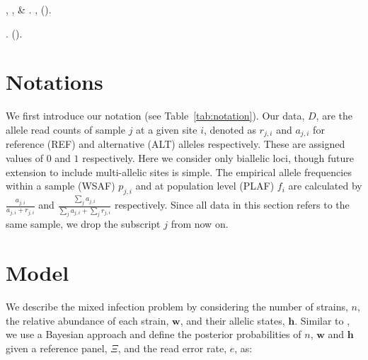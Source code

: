 \documentclass{nature}
\newcounter{firstbib}
\begin{document}
\begin{thebibliography}{10}
, ,
   \& 
\newblock {}.
\newblock \emph{} \textbf{},
   ().

\newblock {}.
\newblock \emph{}  ().

\setcounter{firstbib}{\value{enumiv}}

\end{thebibliography}




\newpage

\section*{Notations}

We first introduce our notation (see Table~\ref{tab:notation}). Our data, $D$, are the allele read counts of sample $j$ at a given site $i$, denoted as $r_{j,i}$ and $a_{j,i}$ for reference (REF) and alternative (ALT) alleles respectively.  These are assigned values of $0$ and $1$ respectively. Here we consider only biallelic loci, though future extension to include multi-allelic sites is simple.  The empirical allele frequencies within a sample (WSAF) $p_{j,i}$ and at population level (PLAF) $f_i$ are calculated by $ \frac{a_{j,i}}{a_{j,i} + r_{j,i}}$ and $ \frac{\sum_j a_{j,i}}{\sum_j a_{j,i} + \sum_j r_{j,i}}$ respectively. Since all data in this section refers to the same sample, we drop the subscript $j$ from now on.


\section*{Model}

We describe the mixed infection problem by considering the number of strains, $n$, the relative abundance of each strain, $\mathbf{w}$, and their allelic states, $\mathbf{h}$. Similar to \cite{Jack2016}, we use a Bayesian approach and define the posterior probabilities of $n$, $\mathbf{w}$ and $\mathbf{h}$ given a reference panel, $\Xi$, and the read error rate, $e$, as:
\end{document}
